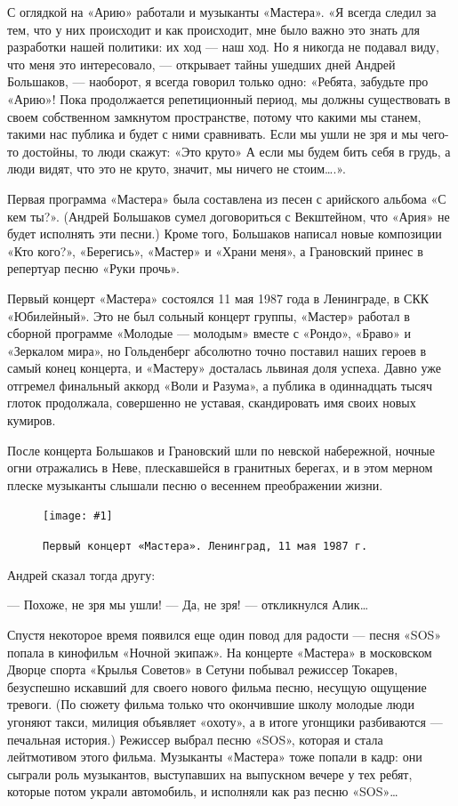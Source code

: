 \documentclass[16pt,a5paper]{book}
\newcommand{\myincludegraphics}[1]{\texttt{[image: \#1]}}
\begin{document}
С оглядкой на «Арию» работали и музыканты «Мастера». «Я всегда следил за тем, что у них происходит и как происходит, мне
было важно это знать для разработки нашей политики: их ход — наш ход. Но я никогда не подавал виду, что меня это
интересовало, — открывает тайны ушедших дней Андрей Большаков, — наоборот, я всегда говорил только одно: «Ребята,
забудьте про «Арию»! Пока продолжается репетиционный период, мы должны существовать в своем собственном замкнутом
пространстве, потому что какими мы станем, такими нас публика и будет с ними сравнивать. Если мы ушли не зря и мы
чего-то достойны, то люди скажут: «Это круто» А если мы будем бить себя в грудь, а люди видят, что это не круто, значит,
мы ничего не стоим\ldots.».

Первая программа «Мастера» была составлена из песен с арийского альбома «С кем ты?». (Андрей Большаков сумел
договориться с Векштейном, что «Ария» не будет исполнять эти песни.) Кроме того, Большаков написал новые композиции
«Кто кого?», «Берегись», «Мастер» и «Храни меня», а Грановский принес в репертуар песню «Руки прочь».

Первый концерт «Мастера» состоялся 11 мая 1987 года в Ленинграде, в СКК «Юбилейный». Это не был сольный концерт группы,
«Мастер» работал в сборной программе «Молодые — молодым» вместе с «Рондо», «Браво» и «Зеркалом мира», но Гольденберг
абсолютно точно поставил наших героев в самый конец концерта, и «Мастеру» досталась львиная доля успеха. Давно уже
отгремел финальный аккорд «Воли и Разума», а публика в одиннадцать тысяч глоток продолжала, совершенно не уставая,
скандировать имя своих новых кумиров.

После концерта Большаков и Грановский шли по невской набережной, ночные огни отражались в Неве, плескавшейся в гранитных
берегах, и в этом мерном плеске музыканты слышали песню о весеннем преображении жизни.

\begin{figure}[h]
    \centering
    \myincludegraphics{Image18}
    \caption{\texttt{Первый концерт «Мастера». Ленинград, 11 мая 1987 г.}}
\end{figure}

Андрей сказал тогда другу:

— Похоже, не зря мы ушли!
— Да, не зря! — откликнулся Алик\ldots

Спустя некоторое время появился еще один повод для радости — песня «SOS» попала в кинофильм «Ночной экипаж». На концерте
«Мастера» в московском Дворце спорта «Крылья Советов» в Сетуни побывал режиссер Токарев, безуспешно искавший для своего
нового фильма песню, несущую ощущение тревоги. (По сюжету фильма только что окончившие школу молодые люди угоняют такси,
милиция объявляет «охоту», а в итоге угонщики разбиваются — печальная история.) Режиссер выбрал песню «SOS», которая и
стала лейтмотивом этого фильма. Музыканты «Мастера» тоже попали в кадр: они сыграли роль музыкантов, выступавших на
выпускном вечере у тех ребят, которые потом украли автомобиль, и исполняли как раз песню «SOS»\ldots
\end{document}
